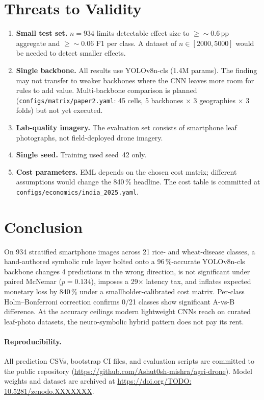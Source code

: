 \documentclass[runningheads]{llncs}
\newcommand{\codeurl}{https://github.com/Ashut0sh-mishra/agri-drone}
\newcommand{\zenododoi}{TODO: 10.5281/zenodo.XXXXXXX}   %
\begin{document}
\section{Threats to Validity}

\begin{enumerate}
  \item \textbf{Small test set.} $n=934$ limits detectable effect size to
        $\geq\!\sim$0.6\,pp aggregate and $\geq\!\sim$0.06 F1 per class.
        A dataset of $n\in[2000,5000]$ would be needed to detect smaller effects.

  \item \textbf{Single backbone.} All results use YOLOv8n-cls (1.4M params).
        The finding may not transfer to weaker backbones where the CNN leaves
        more room for rules to add value. Multi-backbone comparison is planned
        (\texttt{configs/matrix/paper2.yaml}: 45 cells, 5 backbones $\times$
        3 geographies $\times$ 3 folds) but not yet executed.

  \item \textbf{Lab-quality imagery.} The evaluation set consists of
        smartphone leaf photographs, not field-deployed drone imagery.

  \item \textbf{Single seed.} Training used seed~42 only.

  \item \textbf{Cost parameters.} EML depends on the chosen cost matrix;
        different assumptions would change the 840\,\% headline. The cost
        table is committed at \texttt{configs/economics/india\_2025.yaml}.
\end{enumerate}

\section{Conclusion}

On 934 stratified smartphone images across 21 rice- and wheat-disease
classes, a hand-authored symbolic rule layer bolted onto a 96\,\%-accurate
YOLOv8n-cls backbone changes 4 predictions in the wrong direction, is not
significant under paired McNemar ($p=0.134$), imposes a 29$\times$ latency
tax, and inflates expected monetary loss by 840\,\% under a
smallholder-calibrated cost matrix. Per-class Holm--Bonferroni correction
confirms 0/21 classes show significant A-vs-B difference. At the accuracy
ceilings modern lightweight CNNs reach on curated leaf-photo datasets, the
neuro-symbolic hybrid pattern does not pay its rent.

\paragraph{Reproducibility.}
All prediction CSVs, bootstrap CI files, and evaluation scripts are committed
to the public repository (\url{\codeurl}). Model weights and dataset are
archived at \url{https://doi.org/\zenododoi}.



\end{document}
